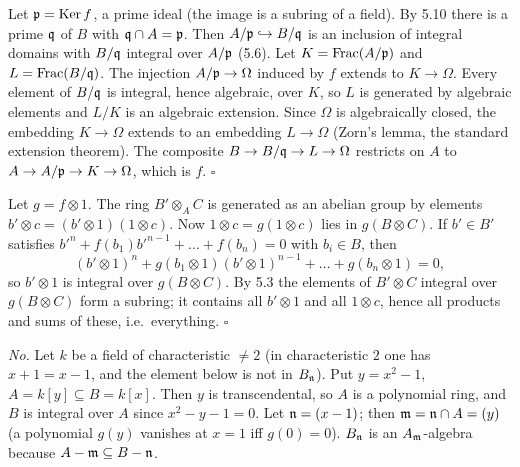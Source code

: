 \documentclass[11pt]{article}
\begin{document}
\pf
Let $\mathfrak p=\operatorname{Ker} f$, a prime ideal (the image is a subring of a field). By 5.10 there is a prime $\mathfrak q$ of $B$ with $\mathfrak q\cap A=\mathfrak p$. Then $A/\mathfrak p\hookrightarrow B/\mathfrak q$ is an inclusion of integral domains with $B/\mathfrak q$ integral over $A/\mathfrak p$ (5.6). Let $K=\operatorname{Frac}(A/\mathfrak p)$ and $L=\operatorname{Frac}(B/\mathfrak q)$. The injection $A/\mathfrak p\to\Omega$ induced by $f$ extends to $K\to\Omega$. Every element of $B/\mathfrak q$ is integral, hence algebraic, over $K$, so $L$ is generated by algebraic elements and $L/K$ is an algebraic extension. Since $\Omega$ is algebraically closed, the embedding $K\to\Omega$ extends to an embedding $L\to\Omega$ (Zorn's lemma, the standard extension theorem). The composite $B\to B/\mathfrak q\to L\to\Omega$ restricts on $A$ to $A\to A/\mathfrak p\to K\to\Omega$, which is $f$. \hfill$\square$

\pf
Let $g=f\otimes1$. The ring $B'\otimes_AC$ is generated as an abelian group by elements $b'\otimes c=(b'\otimes1)(1\otimes c)$. Now $1\otimes c=g(1\otimes c)$ lies in $g(B\otimes C)$. If $b'\in B'$ satisfies $b'^n+f(b_1)b'^{n-1}+\dots+f(b_n)=0$ with $b_i\in B$, then
\[
(b'\otimes1)^n+g(b_1\otimes1)(b'\otimes1)^{n-1}+\dots+g(b_n\otimes1)=0,
\]
so $b'\otimes1$ is integral over $g(B\otimes C)$. By 5.3 the elements of $B'\otimes C$ integral over $g(B\otimes C)$ form a subring; it contains all $b'\otimes1$ and all $1\otimes c$, hence all products and sums of these, i.e.\ everything. \hfill$\square$

\pf
\emph{No.} Let $k$ be a field of characteristic $\ne2$ (in characteristic $2$ one has $x+1=x-1$, and the element below is not in $B_\mathfrak n$). Put $y=x^2-1$, $A=k[y]\subseteq B=k[x]$. Then $y$ is transcendental, so $A$ is a polynomial ring, and $B$ is integral over $A$ since $x^2-y-1=0$. Let $\mathfrak n=(x-1)$; then $\mathfrak m=\mathfrak n\cap A=(y)$ (a polynomial $g(y)$ vanishes at $x=1$ iff $g(0)=0$). $B_\mathfrak n$ is an $A_\mathfrak m$-algebra because $A-\mathfrak m\subseteq B-\mathfrak n$.
\end{document}

